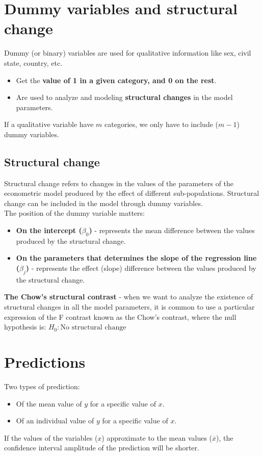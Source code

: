 \documentclass[10pt, a4paper, landscape]{extarticle}
\begin{document}
\begin{multicols}{3}
\section*{Dummy variables and structural change}
	Dummy (or binary) variables are used for qualitative information like sex, civil state, country, etc.
	\begin{itemize}[leftmargin=*]
		\item Get the \textbf{value of 1 in a given category, and 0 on the rest}.
		\item Are used to analyze and modeling \textbf{structural changes} in the model parameters.
	\end{itemize}
	If a qualitative variable have $m$ categories, we only have to include ($m-1$) dummy variables.
	\subsection*{Structural change}
		Structural change refers to changes in the values of the parameters of the econometric model produced by the effect of different sub-populations. Structural change can be included in the model through dummy variables.
		\\ The position of the dummy variable matters:
		\begin{itemize}[leftmargin=*]
			\item \textbf{On the intercept ($\beta_0$)} - represents the mean difference between the values produced by the structural change.
			\item \textbf{On the parameters that determines the slope of the regression line ($\beta_j$)} - represents the effect (slope) difference between the values produced by the structural change.
		\end{itemize}
		\textbf{The Chow's structural contrast} - when we want to analyze the existence of structural changes in all the model parameters, it is common to use a particular expression of the F contrast known as the Chow's contrast, where the null hypothesis is: $H_0: \text{No structural change}$

\section*{Predictions}
	Two types of prediction:
	\begin{itemize}[leftmargin=*]
		\item Of the mean value of $y$ for a specific value of $x$.
		\item Of an individual value of $y$ for a specific value of $x$.
	\end{itemize}
	If the values of the variables ($x$) approximate to the mean values ($\overline{x}$), the confidence interval amplitude of the prediction will be shorter. 
\columnbreak

\end{multicols}
\end{document}
